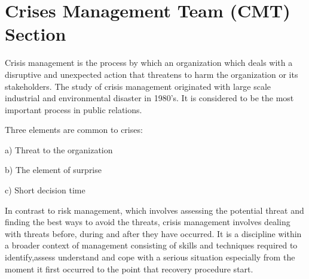 \chapter{Crises Management Team (CMT) Section}

Crisis management is the process by which an organization which
deals with a disruptive and unexpected action that threatens to harm
the organization or its stakeholders. The study of crisis management
originated with large scale industrial and environmental disaster in
1980’s. It is considered to be the most important process in public
relations.

\vspace{1em}


Three elements are common to crises:


a) Threat to the organization

\vspace{1em}

b) The element of surprise

\vspace{1em}


c) Short decision time


\vspace{1em}


In contrast to risk management, which involves assessing the
potential threat and finding the best ways to avoid the threats, crisis
management involves dealing with threats before, during and after
they have occurred. It is a discipline within a broader context of
management consisting of skills and techniques required to identify,assess understand and cope with a serious situation especially from
the moment it first occurred to the point that recovery procedure start.